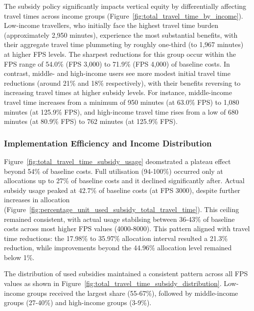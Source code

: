 \documentclass[a4paper,fleqn]{cas-sc}
\begin{document}
The subsidy policy significantly impacts vertical equity by differentially affecting travel times across income groups (Figure~\ref{fig:total_travel_time_by_income}). Low-income travellers, who initially face the highest travel time burden (approximately 2,950 minutes), experience the most substantial benefits, with their aggregate travel time plummeting by roughly one-third (to 1,967 minutes) at higher FPS levels. The sharpest reductions for this group occur within the FPS range of 54.0\% (FPS 3,000) to 71.9\% (FPS 4,000) of baseline costs. In contrast, middle- and high-income users see more modest initial travel time reductions (around 21\% and 18\% respectively), with their benefits reversing to increasing travel times at higher subsidy levels. For instance, middle-income travel time increases from a minimum of 950 minutes (at 63.0\% FPS) to 1,080 minutes (at 125.9\% FPS), and high-income travel time rises from a low of 680 minutes (at 80.9\% FPS) to 762 minutes (at 125.9\% FPS). 


\subsubsection{Implementation Efficiency and Income Distribution}

Figure~\ref{fig:total_travel_time_subsidy_usage} deomstrated a plateau effect beyond 54\% of baseline costs. Full utilisation (94-100\%) occurred only at allocations up to 27\% of baseline costs and it declined significantly after. Actual subsidy usage peaked at 42.7\% of baseline costs (at FPS 3000), despite further increases in allocation (Figure~\ref{fig:percentage_unit_used_subsidy_total_travel_time}). This ceiling remained consistent, with actual usage stabilsing between 36-43\% of baseline costs across most higher FPS values (4000-8000). This pattern aligned with travel time reductions: the 17.98\% to 35.97\% allocation interval resulted a 21.3\% reduction, while improvements beyond the 44.96\% allocation level remained below 1\%.

The distribution of used subsidies maintained a consistent pattern across all FPS values as shown in Figure~\ref{fig:total_travel_time_subsidy_distribution}. Low-income groups received the largest share (55-67\%), followed by middle-income groups (27-40\%) and high-income groups (3-9\%). 
\end{document}
